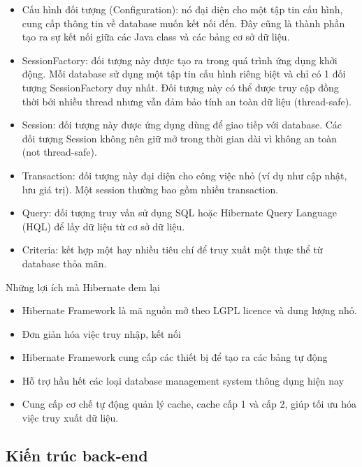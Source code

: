 \documentclass[12pt,a4paper,oneside]{extbook}
\begin{document}
\begin{itemize}[topsep=1mm,itemsep=-0.5mm]
\item Cấu hình đối tượng (Configuration): nó đại diện cho một tập tin cấu hình, cung cấp thông tin về database muốn kết nối đến. Đây cũng là thành phần tạo ra sự kết nối giữa các Java class và các bảng cơ sở dữ liệu.
\item SessionFactory: đối tượng này được tạo ra trong quá trình ứng dụng khởi động. Mỗi database sử dụng một tập tin cấu hình riêng biệt và chỉ có 1 đối tượng SessionFactory duy nhất. Đối tượng này có thể được truy cập đồng thời bởi nhiều thread nhưng vẫn đảm bảo tính an toàn dữ liệu (thread-safe).
\item Session: đối tượng này được ứng dụng dùng để giao tiếp với database. Các đối tượng Session không nên giữ mở trong thời gian dài vì không an toàn (not thread-safe).
\item Transaction: đối tượng này đại diện cho công việc nhỏ (ví dụ như cập nhật, lưu giá trị). Một session thường bao gồm nhiều transaction.
\item Query: đối tượng truy vấn sử dụng SQL hoặc Hibernate Query Language (HQL) để lấy dữ liệu từ cơ sở dữ liệu.
\item Criteria: kết hợp một hay nhiều tiêu chí để truy xuất một thực thể từ database thỏa mãn.
\vspace{1mm}
\end{itemize}

\noindent
Những lợi ích mà Hibernate đem lại

\begin{itemize}[topsep=1mm,itemsep=-0.5mm]
\item Hibernate Framework là mã nguồn mở theo LGPL licence và dung lượng nhỏ.
\item Đơn giản hóa việc truy nhập, kết nối
\item Hibernate Framework cung cấp các thiết bị để tạo ra các bảng tự động
\item Hỗ trợ hầu hết các loại database management system thông dụng hiện nay
\item Cung cấp cơ chế tự động quản lý cache, cache cấp 1 và cấp 2, giúp tối ưu hóa việc truy xuất dữ liệu.
\vspace{1mm}
\end{itemize}

\subsection{Kiến trúc back-end}
\end{document}
